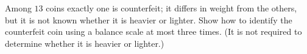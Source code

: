 Among $13$ coins exactly one is counterfeit; it differs in weight from the others, but it is not known whether it is heavier or lighter. Show how to identify the counterfeit coin using a balance scale at most three times. (It is not required to determine whether it is heavier or lighter.)
